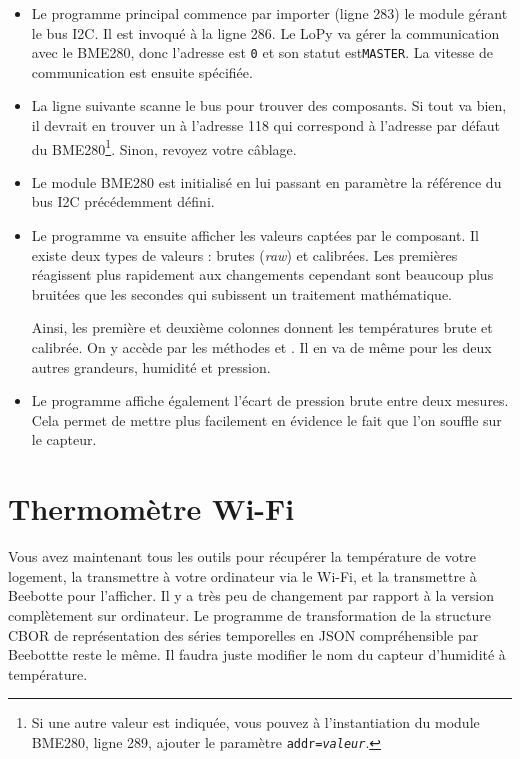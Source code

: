\begin{itemize}

\item Le programme principal commence par importer (ligne 283) le module gérant le bus I2C. Il est invoqué à la ligne 286. Le LoPy va gérer la communication avec le BME280, donc l’adresse est \texttt{0} et son statut est\texttt{MASTER}. La vitesse de communication est ensuite spécifiée.

\item La ligne suivante scanne le bus pour trouver des composants. Si tout va bien, il devrait en trouver un à l’adresse 118 qui correspond à  l’adresse par défaut du BME280\footnote{Si une autre valeur est indiquée, vous pouvez à l'instantiation du module BME280, ligne 289, ajouter le paramètre \texttt{addr=\textit{valeur}}. }. Sinon, revoyez votre câblage.

\item Le module BME280 est initialisé en lui passant en paramètre la référence du bus I2C précédemment défini.

\item Le programme va ensuite afficher les valeurs captées par le composant. Il existe deux types de valeurs : brutes (\textit{raw}) et calibrées. Les premières réagissent plus rapidement aux changements cependant sont beaucoup plus bruitées que les secondes qui subissent un traitement mathématique.

Ainsi, les première et deuxième colonnes donnent les températures brute et calibrée. On y accède par les méthodes  et . Il en va de même pour les deux autres grandeurs, humidité et pression.
\item Le programme affiche également l’écart de pression brute entre deux mesures. Cela permet de mettre plus facilement en évidence le fait que l’on souffle sur le capteur.
\end{itemize}

\section{Thermomètre Wi-Fi}

\begin{figure}
\end{figure}

Vous avez maintenant tous les outils pour récupérer la température de votre logement, la transmettre à votre ordinateur via le Wi-Fi, et la transmettre à Beebotte pour l'afficher. Il y a très peu de changement par rapport à la version complètement sur ordinateur. Le programme de transformation de la structure CBOR de représentation des séries temporelles en JSON compréhensible par Beebottte reste le même. Il faudra juste modifier le nom du capteur d'humidité à température.

